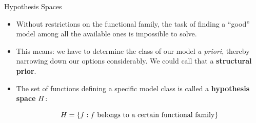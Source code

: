 \documentclass[11pt,compress,t,notes=noshow, xcolor=table]{beamer}
\begin{document}

\begin{vbframe}{Hypothesis Spaces}

\begin{itemize}

  \item Without restrictions on the functional family, the task of finding a 
  \enquote{good} model among all the available ones is impossible to solve.
  
  \item This means: we have to determine the class of our model \emph{a priori}, 
  thereby narrowing down our options considerably. We could call that a 
  \textbf{structural prior}.
  
  \item The set of functions defining a specific model class is called a 
  \textbf{hypothesis space} $H$:
  
  $$H = \{f: f \text{ belongs to a certain functional family}\}$$
  

\end{itemize}  

\end{vbframe}

\end{document}
